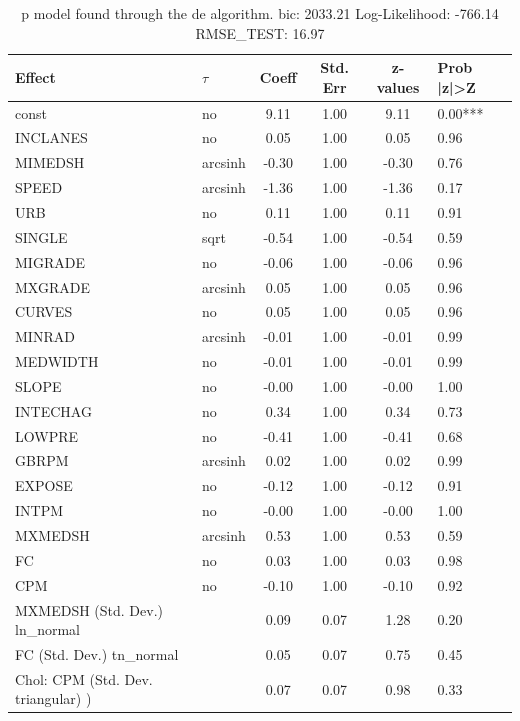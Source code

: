 \begin{table}
	\caption{p model found through the de algorithm. bic: 2033.21 Log-Likelihood: -766.14 RMSE_TEST: 16.97}
	\begin{center}
		\begin{tabular}{|l|l|c|c|c|l|}
			\hline
			Effect & $\tau$ & Coeff & Std. Err & z-values & Prob |z|>Z \\
			\hline
			const & no & 9.11 & 1.00 & 9.11 & 0.00*** \\
			\hline
			INCLANES & no & 0.05 & 1.00 & 0.05 & 0.96 \\
			\hline
			MIMEDSH & arcsinh & -0.30 & 1.00 & -0.30 & 0.76 \\
			\hline
			SPEED & arcsinh & -1.36 & 1.00 & -1.36 & 0.17 \\
			\hline
			URB & no & 0.11 & 1.00 & 0.11 & 0.91 \\
			\hline
			SINGLE & sqrt & -0.54 & 1.00 & -0.54 & 0.59 \\
			\hline
			MIGRADE & no & -0.06 & 1.00 & -0.06 & 0.96 \\
			\hline
			MXGRADE & arcsinh & 0.05 & 1.00 & 0.05 & 0.96 \\
			\hline
			CURVES & no & 0.05 & 1.00 & 0.05 & 0.96 \\
			\hline
			MINRAD & arcsinh & -0.01 & 1.00 & -0.01 & 0.99 \\
			\hline
			MEDWIDTH & no & -0.01 & 1.00 & -0.01 & 0.99 \\
			\hline
			SLOPE & no & -0.00 & 1.00 & -0.00 & 1.00 \\
			\hline
			INTECHAG & no & 0.34 & 1.00 & 0.34 & 0.73 \\
			\hline
			LOWPRE & no & -0.41 & 1.00 & -0.41 & 0.68 \\
			\hline
			GBRPM & arcsinh & 0.02 & 1.00 & 0.02 & 0.99 \\
			\hline
			EXPOSE & no & -0.12 & 1.00 & -0.12 & 0.91 \\
			\hline
			INTPM & no & -0.00 & 1.00 & -0.00 & 1.00 \\
			\hline
			MXMEDSH & arcsinh & 0.53 & 1.00 & 0.53 & 0.59 \\
			\hline
			FC & no & 0.03 & 1.00 & 0.03 & 0.98 \\
			\hline
			CPM & no & -0.10 & 1.00 & -0.10 & 0.92 \\
			\hline
			MXMEDSH (Std. Dev.) ln_normal &  & 0.09 & 0.07 & 1.28 & 0.20 \\
			\hline
			FC (Std. Dev.) tn_normal &  & 0.05 & 0.07 & 0.75 & 0.45 \\
			\hline
			 Chol: CPM (Std. Dev. triangular) ) &  & 0.07 & 0.07 & 0.98 & 0.33 \\
			\hline
		\end{tabular}
	\end{center}
\end{table}
